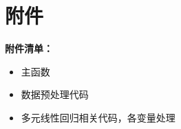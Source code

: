 \documentclass{my_paper}
\begin{document}
\newpage
\begin{center}
\end{center}

\newpage
\section{附件}
\textbf{附件清单：}
\renewcommand\theenumi{\roman{enumi}}
\renewcommand\labelenumi{\textbf{附录\theenumi}}
\begin{itemize}
    \item 主函数
    
    
    \item 数据预处理代码
    


    \item 多元线性回归相关代码，各变量处理
    
    
    
    
    
    
    
    
    
    
    

    
\end{itemize}


% 
\end{document}
